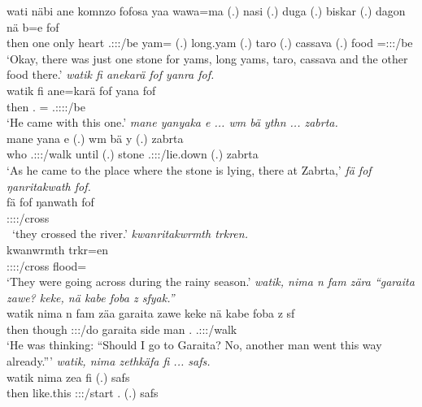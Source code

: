 \begin{exe}
	\gll wati näbi ane komnzo fofosa yaa wawa=ma (.) nasi (.) duga (.) biskar (.) dagon nä b=e fof\\ 
	then one {\Dem} only heart \Tsg.\Masc:\Sbj:\Pst:\Ipfv/be yam={\Char} (.) long.yam (.) taro (.) cassava (.) food {\Indf} \Med=\Stpl:\Sbj:\Nonpast:\Ipfv/be {\Emph}\\
	\trans `Okay, there was just one stone for yams, long yams, taro, cassava and the other food there.'
	\emph{watik fi anekarä fof yanra fof.}\\
	\gll watik fi ane=karä fof yana fof\\ 
	then \Third.{\Abs} \Dem={\Prop} {\Emph} \Tsg.\Masc:\Sbj:\Pst:\Ipfv:\Venit/be \Emph\\
	\trans `He came with this one.'
	\emph{mane yanyaka e ... wm bä ythn ... zabrta.}\\
	\gll mane yana e (.) wm bä y (.) zabrta\\ 
	who \Tsg.\Masc:\Sbj:\Pst:\Ipfv/walk until (.) stone \Med{} \Tsg.\Masc:\Sbj:\Nonpast:\Ipfv/lie.down (.) zabrta\\
	\trans `As he came to the place where the stone is lying, there at Zabrta,'
	\emph{fä fof ŋanritakwath fof.}\\
	\gll fä fof ŋanwath fof\\ 
	{\Dist} {\Emph} \Stpl:\Sbj:\Pst:\Ipfv:\Venit/cross {\Emph}\\\
	\trans `they crossed the river.'
	\emph{kwanritakwrmth trkren.}\\
	\gll kwanwrmth trkr=en\\ 
	\Stpl:\Sbj:\Pst:\Dur:\Venit/cross flood=\Loc\\
	\trans `They were going across during the rainy season.'
	\emph{watik, nima n fam zära ``garaita zawe? keke, nä kabe foba z sfyak.''}\\
	\gll watik nima n fam zä\stem{r}a garaita zawe keke nä kabe foba z sf\\ 
	then {\Quot} {\Imn} though \Sg:\Sbj:\Pst:\Ipfv/do garaita side {\Neg} {\Indf} man \Dist.{\Abl} {\Iam} \Tsg.\Masc:\Sbj:\Pst:\Ipfv/walk\\
	\trans `He was thinking: ``Should I go to Garaita? No, another man went this way already.'''
\exi{104} 
	\emph{watik, nima zethkäfa fi ... safs.}\\
	\gll watik nima zea fi (.) safs\\ 
	then like.this \Sg:\Sbj:\Pst:\Pfv/start \Third.{\Abs} (.) safs\\

\end{exe}
